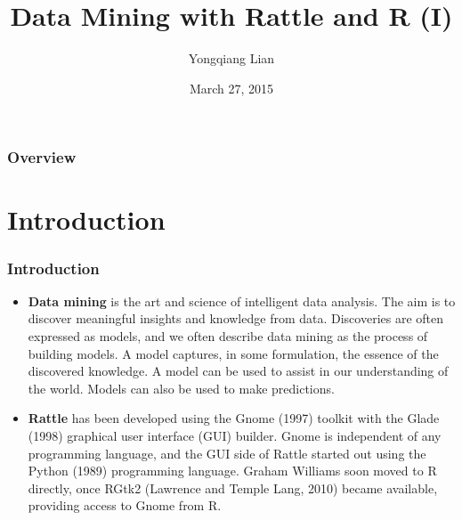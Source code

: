 \documentclass{beamer}\usepackage[]{graphicx}\usepackage[]{color}
\begin{document}
\title[Rattle]{Data Mining with Rattle and R (I)} %
\author{Yongqiang Lian} %
\date{March 27, 2015}

\begin{frame}
\titlepage %
\thispagestyle{empty}
\addtocounter{framenumber}{-1}
\end{frame}

\begin{frame}
\frametitle{Overview} %
\tableofcontents %
\end{frame}

\section{Introduction}
\begin{frame}
\frametitle{Introduction}
\begin{itemize}
\item \textbf{Data mining} is the art and science of intelligent data analysis. The aim is to discover meaningful insights and knowledge from data. Discoveries are often expressed as models, and we often describe data mining as the process of building models. A model captures, in some formulation, the essence of the discovered knowledge. A model can be used to assist in our understanding of the world. Models can also be used to make predictions.
\item \textbf{Rattle} has been developed using the Gnome (1997) toolkit with the Glade (1998) graphical user interface (GUI) builder. Gnome is independent of any programming language, and the GUI side of Rattle started out using the Python (1989) programming language. Graham Williams soon moved to R directly, once RGtk2 (Lawrence and Temple Lang, 2010) became available, providing access to Gnome from R.
\end{itemize}
\end{frame}
\end{document}
